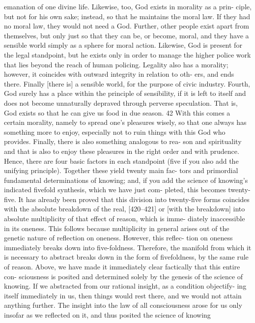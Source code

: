 emanation of one divine life. Likewise, too, God exists in morality as a prin-
ciple, but not for his own sake; instead, so that he maintains the moral law. If
they had no moral law, they would not need a God. Further, other people exist
apart from themselves, but only just so that they can be, or become, moral, and
they have a sensible world simply as a sphere for moral action. Likewise, God
is present for the legal standpoint, but he exists only in order to manage the
higher police work that lies beyond the reach of human policing. Legality also
has a morality; however, it coincides with outward integrity in relation to oth-
ers, and ends there. Finally [there is] a sensible world, for the purpose of civic
industry. Fourth, God surely has a place within the principle of sensibility, if
it is left to itself and does not become unnaturally depraved through perverse
speculation. That is, God exists so that he can give us food in due season. 42
With this comes a certain morality, namely to spread one’s pleasures wisely, so
that one always has something more to enjoy, especially not to ruin things
with this God who provides. Finally, there is also something analogous to rea-
son and spirituality and that is also to enjoy these pleasures in the right order
and with prudence. Hence, there are four basic factors in each standpoint (five
if you also add the unifying principle). Together these yield twenty main fac-
tors and primordial fundamental determinations of knowing; and, if you add
the science of knowing’s indicated fivefold synthesis, which we have just com-
pleted, this becomes twenty-five.
It has already been proved that this division into twenty-five forms
coincides with the absolute breakdown of the real, [420–421] or [with the
breakdown] into absolute multiplicity of that effect of reason, which is imme-
diately inaccessible in its oneness. This follows because multiplicity in general
arises out of the genetic nature of reflection on oneness. However, this reflec-
tion on oneness immediately breaks down into five-foldness. Therefore, the
manifold from which it is necessary to abstract breaks down in the form of
fivefoldness, by the same rule of reason.
Above, we have made it immediately clear factically that this entire con-
sciousness is posited and determined solely by the genesis of the science of
knowing. If we abstracted from our rational insight, as a condition objectify-
ing itself immediately in us, then things would rest there, and we would not
attain anything further. The insight into the law of all consciousness arose for
us only insofar as we reflected on it, and thus posited the science of knowing
